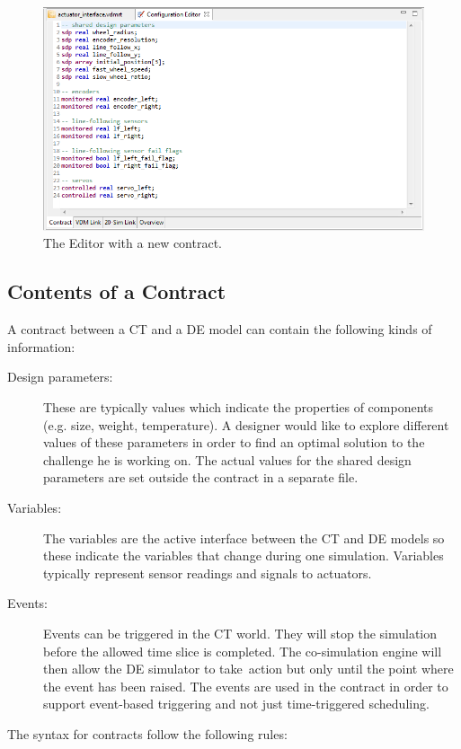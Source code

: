 \documentclass{crescendorepchap}
\begin{document}
\begin{figure}[htbp]
\centering
\includegraphics[width=.6\textwidth]{images/DestecsEditorNewContract.png}
\caption{The Editor with a new contract.\label{fig:editorcontract2}}
\end{figure}

\subsection{Contents of a Contract}

A contract between a CT and a DE model can contain the following kinds of
information:

\begin{description}
\item[Design parameters:] These are typically values which indicate
  the properties of components (e.g. size, weight, temperature). A
  designer would like to explore different values of these parameters in
  order to find an optimal solution to the challenge he is working on.
  The actual values for the shared design parameters are set outside the
  contract in a separate file.
\item[Variables:] The variables are the active interface between the
  CT and DE models so these indicate the variables that change during
  one simulation. Variables typically represent sensor readings and
  signals to actuators.
\item[Events:] Events can be triggered in the CT world. They
  will stop the simulation before the allowed time slice is completed.
  The co-simulation engine will then allow the DE simulator to
  take~action but only until the point where the event has been raised.
  The events are used in the contract in order to support event-based
  triggering and not just time-triggered scheduling.
\end{description}

The syntax for contracts follow the following rules:
\end{document}
